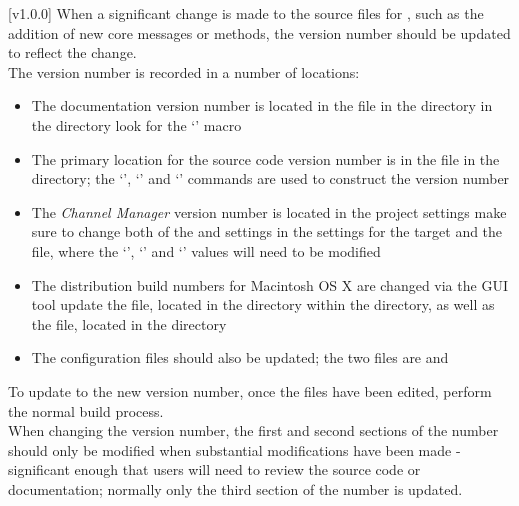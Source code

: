 [v1.0.0]
When a significant change is made to the source files for \mplusm, such as the addition of
new core messages or methods, the version number should be updated to reflect the
change.\\

The version number is recorded in a number of locations:
\begin{itemize}
\item The documentation version number is located in the  file in
the  directory in the  directory
\longDash{} look for the `' macro
\item\exSp{} The primary location for the source code version number is in the
 file in the  directory; the
`', `'
and `' commands are used to construct the version
number
\item\exSp{} The \emph{Channel Manager} version number is located in the 
project settings \longDash{} make sure to change both of the  and
 settings in the  settings for the 
target \longDash{} and the  file, where the `',
`' and `' values will need to be modified
\item\exSp{} The distribution build numbers for Macintosh OS X are changed via the
 GUI tool \longDash{} update the  file, located in the
 directory within the 
directory, as well as the  file, located in the
 directory
\item\exSp{} The  configuration files should also be updated; the two
files are  and
\end{itemize}
To update to the new version number, once the files have been edited, perform the normal
build process.\\

When changing the version number, the first and second sections of the number should only
be modified when substantial modifications have been made - significant enough that users
will need to review the source code or documentation; normally only the third section of
the number is updated.
\appendixEnd{}



